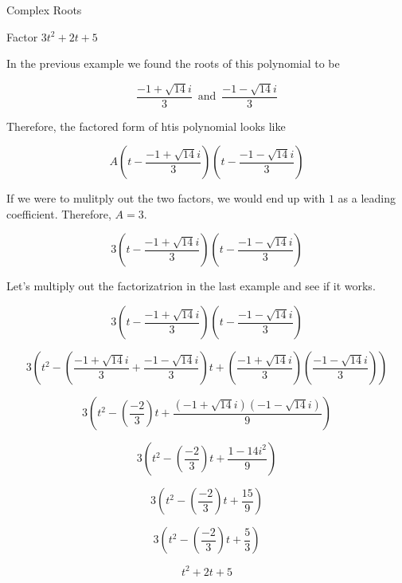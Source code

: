 \documentclass{ximera}
\begin{document}
\begin{example} Complex Roots

Factor $3 t^2 + 2 t + 5$


In the previous example we found the roots of this polynomial to be


\[     \frac{-1 + \sqrt{14} i}{3}   \,  \text{ and } \, \frac{-1 - \sqrt{14} i}{3}         \]

Therefore, the factored form of htis polynomial looks like


\[     A \left(t - \frac{-1 + \sqrt{14} i}{3} \right) \left(t -  \frac{-1 - \sqrt{14} i}{3} \right)        \]


If we were to mulitply out the two factors, we would end up with $1$ as a leading coefficient.  Therefore, $A = 3$.

\[     3 \left(t - \frac{-1 + \sqrt{14} i}{3} \right) \left(t -  \frac{-1 - \sqrt{14} i}{3} \right)        \]

\end{example}





Let's multiply out the factorizatrion in the last example and see if it works.



\[     3 \left(t - \frac{-1 + \sqrt{14} i}{3} \right) \left(t -  \frac{-1 - \sqrt{14} i}{3} \right)        \]


\[     3 \left(  t^2 - \left(\frac{-1 + \sqrt{14} i}{3} + \frac{-1 - \sqrt{14} i}{3}\right) t + \left(\frac{-1 + \sqrt{14} i}{3}\right) \left(\frac{-1 - \sqrt{14} i}{3}\right)      \right)       \]



\[     3 \left(  t^2 - \left(\frac{-2}{3} \right) t + \frac{(-1 + \sqrt{14} i)(-1 - \sqrt{14} i)}{9}\right)     \]



\[     3 \left(  t^2 - \left(\frac{-2}{3} \right) t + \frac{1 - 14 i^2}{9}\right)     \]


\[     3 \left(  t^2 - \left(\frac{-2}{3} \right) t + \frac{15}{9} \right)     \]


\[     3 \left(  t^2 - \left(\frac{-2}{3} \right) t + \frac{5}{3}\right)     \]



\[      t^2 + 2t + 5   \]
\end{document}
